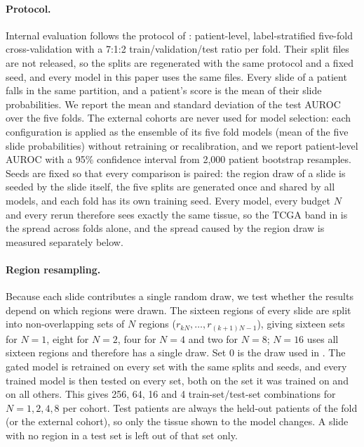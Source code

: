 \documentclass{midl} %
\begin{document}
\paragraph{Protocol.}
Internal evaluation follows the protocol of \citet{guo2026}: patient-level, label-stratified
five-fold cross-validation with a 7:1:2 train/validation/test ratio per fold. Their split
files are not released, so the splits are regenerated with the same protocol and a fixed seed,
and every model in this paper uses the same files. Every slide of a patient falls in the same
partition, and a patient's score is the mean of their slide probabilities. We report the mean
and standard deviation of the test AUROC over the five folds. The external cohorts are never
used for model selection: each configuration is applied as the ensemble of its five fold models
(mean of the five slide probabilities) without retraining or recalibration, and we report
patient-level AUROC with a 95\% confidence interval from 2,000 patient bootstrap resamples.
Seeds are fixed so that every comparison is paired: the region draw of a slide is seeded by the
slide itself, the five splits are generated once and shared by all models, and each fold has
its own training seed. Every model, every budget $N$ and every rerun therefore sees exactly the
same tissue, so the TCGA band in  is the spread across folds alone,
and the spread caused by the region draw is measured separately below.

\paragraph{Region resampling.}
Because each slide contributes a single random draw, we test whether the results depend on which
regions were drawn. The sixteen regions of every slide are split into non-overlapping sets of
$N$ regions ($r_{kN},\dots,r_{(k+1)N-1}$), giving sixteen sets for $N=1$, eight for $N=2$, four
for $N=4$ and two for $N=8$; $N=16$ uses all sixteen regions and therefore has a single draw. Set 0 is the draw
used in . The
gated model is retrained on every set with the same splits and seeds, and every trained model is
then tested on every set, both on the set it was trained on and on all others. This gives 256,
64, 16 and 4 train-set/test-set combinations for $N = 1, 2, 4, 8$ per cohort. Test patients are always the
held-out patients of the fold (or the external cohort), so only the tissue shown to the model
changes. A slide with no region in a test set is left out of that set only.
\end{document}
